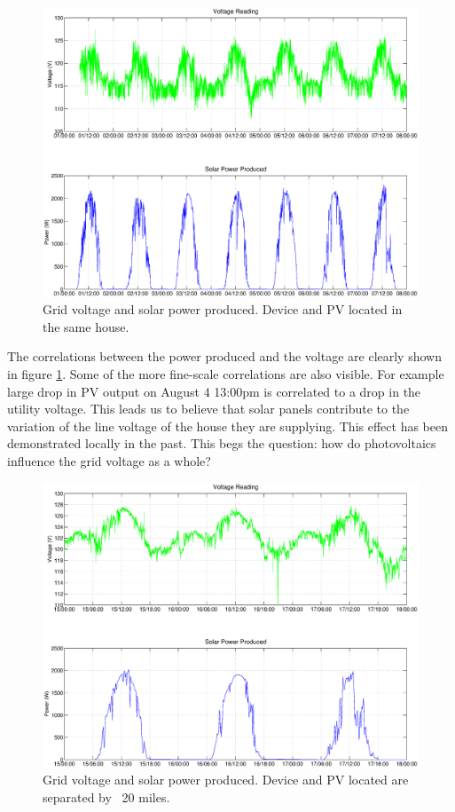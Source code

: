 \begin{figure}[h!]
\centering
\includegraphics[width=\textwidth]{img/solarCorelationSameHouse.eps}
\caption{Grid voltage and solar power produced. Device and PV located in the same house.}
\label{fig:samehouse}
\end{figure}

The correlations between the power produced and the voltage are clearly shown in figure  \ref{fig:samehouse}. Some of the more fine-scale correlations are also visible. 
For example large drop in PV output on August 4 13:00pm is correlated to a drop in the utility voltage. This leads us to believe that solar panels contribute to the
variation of the line voltage of the house they are supplying. This effect has been demonstrated locally in the past.\cite{pq_effect1} This begs the question: how do photovoltaics influence the grid voltage as a whole?

\begin{figure}[h!]
\centering
\includegraphics[width=\textwidth]{img/SunnyWeather.eps}
\caption{Grid voltage and solar power produced. Device and PV located are separated by ~20 miles.}
\label{fig:diffhouse}
\end{figure} 


